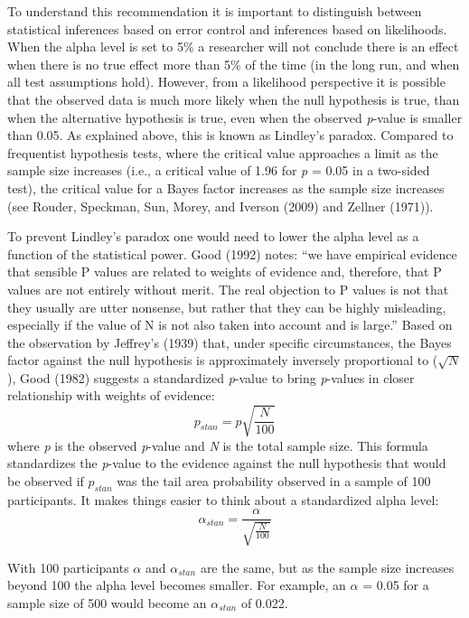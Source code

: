 \documentclass[,jou,floatsintext]{apa6}
\begin{document}
To understand this recommendation it is important to distinguish between statistical inferences based on error control and inferences based on likelihoods. When the alpha level is set to 5\% a researcher will not conclude there is an effect when there is no true effect more than 5\% of the time (in the long run, and when all test assumptions hold). However, from a likelihood perspective it is possible that the observed data is much more likely when the null hypothesis is true, than when the alternative hypothesis is true, even when the observed \emph{p}-value is smaller than 0.05. As explained above, this is known as Lindley's paradox. Compared to frequentist hypothesis tests, where the critical value approaches a limit as the sample size increases (i.e., a critical value of 1.96 for \emph{p} = 0.05 in a two-sided test), the critical value for a Bayes factor increases as the sample size increases (see Rouder, Speckman, Sun, Morey, and Iverson (2009) and Zellner (1971)).

To prevent Lindley's paradox one would need to lower the alpha level as a function of the statistical power. Good (1992) notes: \enquote{we have empirical evidence that sensible P values are related to weights of evidence and, therefore, that P values are not entirely without merit. The real objection to P values is not that they usually are utter nonsense, but rather that they can be highly misleading, especially if the value of N is not also taken into account and is large.} Based on the observation by Jeffrey's (1939) that, under specific circumstances, the Bayes factor against the null hypothesis is approximately inversely proportional to (\(\sqrt{N}\)), Good (1982) suggests a standardized \emph{p}-value to bring \emph{p}-values in closer relationship with weights of evidence:
\begin{equation}
p_{stan} = p\sqrt{\frac{N}{100}} 
\label{eq:pstan}
\end{equation}
where \emph{p} is the observed \emph{p}-value and \emph{N} is the total sample size. This formula standardizes the \emph{p}-value to the evidence against the null hypothesis that would be observed if \(p_{stan}\) was the tail area probability observed in a sample of 100 participants. It makes things easier to think about a standardized alpha level:
\begin{equation}
\alpha_{stan} = \frac{\alpha}{\sqrt{\frac{N}{100}}} \label{eq:astan}
\end{equation}

With 100 participants \(\alpha\) and \(\alpha_{stan}\) are the same, but as the sample size increases beyond 100 the alpha level becomes smaller. For example, an \(\alpha\) = 0.05 for a sample size of 500 would become an \(\alpha_{stan}\) of 0.022.
\end{document}
